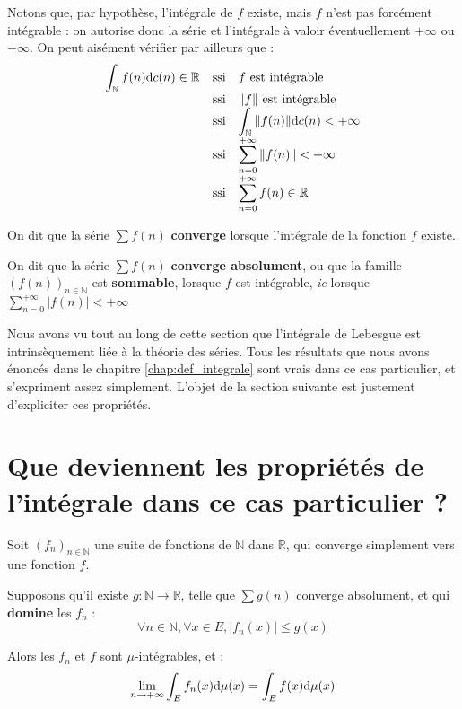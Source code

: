 \documentclass[../integ-proba.tex]{subfiles}
\begin{document}
    \begin{rem}
        Notons que, par hypothèse, l'intégrale de $f$ existe, mais $f$ n'est pas forcément intégrable : on autorise donc la série et l'intégrale à valoir éventuellement $+\infty$ ou $-\infty$.
        On peut aisément vérifier par ailleurs que :
        $$
        {
        \everymath={\displaystyle}
        \begin{array}{rcl}
            \int_\mathbb{N} f(n) \text{d} c(n) \in \mathbb{R} & \text{ssi} & f \text{ est intégrable } \\
                                                              & \text{ssi} & \|f\| \text{ est intégrable} \\
                                                              & \text{ssi} & \int_\mathbb{N} \|f(n)\| \text{d} c(n) < + \infty \\
                                                              & \text{ssi} & \sum_{n=0}^{+ \infty} \|f(n)\| < + \infty \\
                                                              & \text{ssi} & \sum_{n=0}^{+ \infty} f(n) \in \mathbb{R}
        \end{array}
        }
        $$
    \end{rem}

    \begin{defi}
        On dit que la série $\sum f(n)$ \textbf{converge} lorsque l'intégrale de la fonction $f$ existe.

        On dit que la série $\sum f(n)$ \textbf{converge absolument}, ou que la famille $\left(f(n)\right)_{n \in \mathbb{N}}$ est \textbf{sommable}, lorsque $f$ est intégrable, \textit{ie} lorsque $\sum_{n=0}^{+ \infty} \left|f(n)\right| < + \infty$
    \end{defi}

    Nous avons vu tout au long de cette section que l'intégrale de Lebesgue est intrinsèquement liée à la théorie des séries.
    Tous les résultats que nous avons énoncés dans le chapitre \ref{chap:def_integrale} sont vrais dans ce cas particulier, et s'expriment assez simplement.
    L'objet de la section suivante est justement d'expliciter ces propriétés.

    \section{Que deviennent les propriétés de l'intégrale dans ce cas particulier ?}

    \begin{thm}
      Soit $\left(f_n\right)_{n \in \mathbb{N}}$ une suite de fonctions de $\mathbb{N}$ dans $\mathbb{R}$, qui converge simplement vers une fonction $f$.

      Supposons qu'il existe $g:\mathbb{N} \longrightarrow \mathbb{R}$, telle que $\sum g(n)$ converge absolument, et qui \textbf{domine} les $f_n$ :
      $$
      \forall n \in \mathbb{N}, \forall x \in E, \left|f_n(x)\right| \leq g(x)
      $$

      Alors les $f_n$ et $f$ sont $\mu$-intégrables, et :
      $$
      \lim_{n \to + \infty} \int_E f_n(x) \textnormal{d}\mu(x) = \int_E f(x) \textnormal{d}\mu(x)
      $$
    \end{thm}
\end{document}
